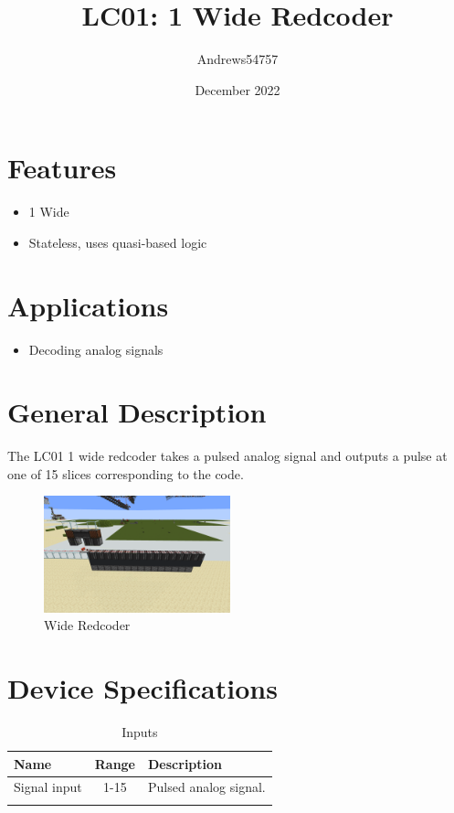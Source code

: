 \documentclass[10pt]{datasheet}
\title{LC01: 1 Wide Redcoder}
\author{Andrews54757}
\date{December 2022}
\begin{document}
\maketitle

\section{Features}

\begin{itemize}
\item{1 Wide}
\item{Stateless, uses quasi-based logic}
\end{itemize}

\section{Applications}

\begin{itemize}
\item{Decoding analog signals}
\end{itemize}

\section{General Description}
The LC01 1 wide redcoder takes a pulsed analog signal and outputs a pulse at one of 15 slices corresponding to the code.
\vfill\break

\begin{figure}[h]
    \centering
    \includegraphics[width=0.48\textwidth]{redcoder.png}
    \caption{ Wide Redcoder}
\end{figure}

\onecolumn

\section{Device Specifications}

\begin{table}[h]
    \caption{Inputs}
    \begin{tabularx}{\textwidth}{l | c | X}
        \thickhline
        \textbf{Name} & \textbf{Range} & \textbf{Description} \\
        \hline
        Signal input & 1-15 & Pulsed analog signal. \\
        \thickhline
\end{tabularx}
\end{table}
\end{document}
